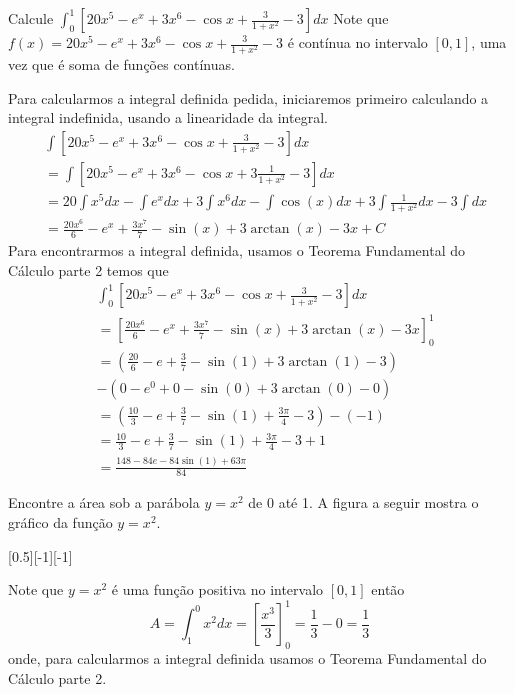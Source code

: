 \begin{example}
  Calcule \(\int_0^1 \left[ 20x^5-e^x+ 3x^6- \cos x+ \frac{3}{1+x^2}-3 \right] dx\)
  \solution
  Note que  $f(x)=20x^5-e^x+ 3x^6- \cos x+ \frac{3}{1+x^2}-3 $ é contínua no
  intervalo $[0,1]$, uma vez que é soma de funções contínuas.

  Para calcularmos a integral definida pedida, iniciaremos primeiro calculando
  a integral indefinida, usando a linearidade da integral.
  \begin{align*}
    & \int [ 20x^5-e^x+ 3x^6- \cos x+ \frac{3}{1+x^2}-3] dx \\
    & = \int [20x^5-e^x+ 3x^6 - \cos x+ 3\frac{1}{1+x^2}-3] dx \\
    & = 20 \int x^5 dx
    -   \int e^x dx
    + 3 \int x^6 dx
    -   \int \cos(x) dx
    + 3 \int \frac{1}{1+x^2} dx
    - 3 \int dx \\
    & = \frac{20x^6}{6}
    - e^x
    + \frac{3x^7}{7}
    - \sin(x)
    + 3\arctan(x)
    - 3x + C
  \end{align*}
  Para encontrarmos a integral definida, usamos o Teorema Fundamental do
  Cálculo parte 2 temos que
  \begin{align*}
    & \int_0^1 \left[ 20x^5-e^x+ 3x^6- \cos x+ \frac{3}{1+x^2}-3 \right] dx \\
    &= \left[ \frac{20x^6}{6}
    - e^x
    + \frac{3x^7}{7}
    - \sin(x)
    + 3\arctan(x)
    - 3x \right]_0^1 \\
    &= \left( \frac{20}{6}
    - e
    + \frac{3}{7}
    - \sin(1)
    + 3 \arctan(1)
    - 3 \right) \\
    & - \left( 0 - e^0 + 0 - \sin(0) + 3\arctan(0) - 0 \right) \\
    & = \left(\frac{10}{3}-e+\frac{3}{7}-\sin(1) + \frac{3\pi}{4} - 3 \right) - (-1) \\
    & = \frac{10}{3} - e + \frac{3}{7} - \sin(1) + \frac{3\pi}{4} - 3 + 1 \\
    & = \frac{148 - 84e - 84 \sin(1) + 63 \pi}{84}
  \end{align*}
\end{example}


\begin{example}
  Encontre a área sob a parábola $y=x^2$ de 0 até 1.
  \solution
  A figura a seguir mostra o gráfico da função $y=x^2$.

  [0.5][-1][-1]

  Note que $y=x^2$ é uma função positiva no intervalo $[0,1]$
  então
  \[
  A
  = \int^{0}_{1} x^2 dx
  = \left[ \frac{x^3}{3} \right]^1_0
  = \frac{1}{3}-0= \frac{1}{3}
  \]
  onde, para calcularmos a integral definida usamos o
  Teorema Fundamental do Cálculo parte 2.
\end{example}


